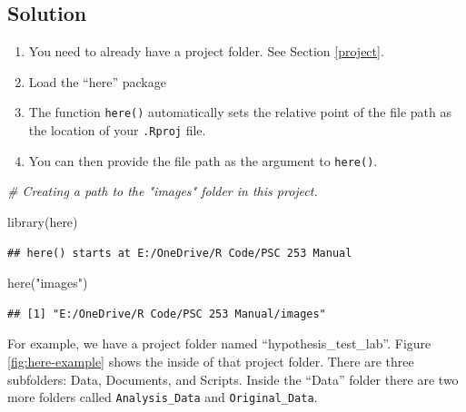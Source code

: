 \documentclass[
]{book}
\newenvironment{Shaded}{\begin{snugshade}}{\end{snugshade}}
\newcommand{\CommentTok}[1]{\textcolor[rgb]{0.56,0.35,0.01}{\textit{#1}}}
\newcommand{\FunctionTok}[1]{\textcolor[rgb]{0.00,0.00,0.00}{#1}}
\newcommand{\NormalTok}[1]{#1}
\newcommand{\StringTok}[1]{\textcolor[rgb]{0.31,0.60,0.02}{#1}}
\providecommand{\tightlist}{%
  \setlength{\itemsep}{0pt}\setlength{\parskip}{0pt}}
\begin{document}
\hypertarget{solution-8}{%
\subsection{Solution}\label{solution-8}}

\begin{enumerate}
\def\labelenumi{\arabic{enumi}.}
\tightlist
\item
  You need to already have a project folder. See Section \ref{project}.
\item
  Load the ``here'' package
\item
  The function \texttt{here()} automatically sets the relative point of the file path as the location of your \texttt{.Rproj} file.
\item
  You can then provide the file path as the argument to \texttt{here()}.
\end{enumerate}

\begin{Shaded}
\begin{Highlighting}[]
\CommentTok{\# Creating a path to the "images" folder in this project.}

\FunctionTok{library}\NormalTok{(here)}
\end{Highlighting}
\end{Shaded}

\begin{verbatim}
## here() starts at E:/OneDrive/R Code/PSC 253 Manual
\end{verbatim}

\begin{Shaded}
\begin{Highlighting}[]
\FunctionTok{here}\NormalTok{(}\StringTok{"images"}\NormalTok{)}
\end{Highlighting}
\end{Shaded}

\begin{verbatim}
## [1] "E:/OneDrive/R Code/PSC 253 Manual/images"
\end{verbatim}

For example, we have a project folder named ``hypothesis\_test\_lab''. Figure \ref{fig:here-example} shows the inside of that project folder. There are three subfolders: Data, Documents, and Scripts. Inside the ``Data'' folder there are two more folders called \texttt{Analysis\_Data} and \texttt{Original\_Data}.
\end{document}
